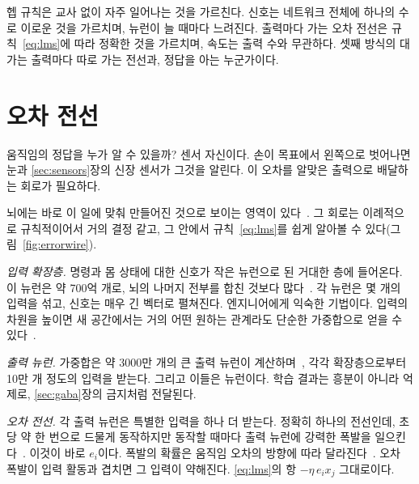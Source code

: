 \begin{keyblock}
\begin{proposition}[세 교사]
\label{prop:teachers}
헵 규칙은 교사 없이 자주 일어나는 것을 가르친다.  신호는 네트워크 전체에 하나의 수로 이로운 것을 가르치며, 뉴런이 늘 때마다 느려진다. 출력마다 가는 오차 전선은 규칙~\eqref{eq:lms}에 따라 정확한 것을 가르치며, 속도는 출력 수와 무관하다. 셋째 방식의 대가는 출력마다 따로 가는 전선과, 정답을 아는 누군가이다.
\end{proposition}
\end{keyblock}

\section{오차 전선}

움직임의 정답을 누가 알 수 있을까? 센서 자신이다. 손이 목표에서 왼쪽으로 벗어나면 눈과 \ref{sec:sensors}장의 신장 센서가 그것을 알린다. 이 오차를 알맞은 출력으로 배달하는 회로가 필요하다.

뇌에는 바로 이 일에 맞춰 만들어진 것으로 보이는 영역이 있다~\cite{Marr1969,Albus1971}. 그 회로는 이례적으로 규칙적이어서 거의 결정 같고, 그 안에서 규칙~\eqref{eq:lms}를 쉽게 알아볼 수 있다(그림~\ref{fig:errorwire}).

\emph{입력 확장층.} 명령과 몸 상태에 대한 신호가 작은  뉴런으로 된 거대한 층에 들어온다. 이 뉴런은 약 700억 개로, 뇌의 나머지 전부를 합친 것보다 많다~\cite{Azevedo2009}. 각 뉴런은 몇 개의 입력을 섞고, 신호는 매우 긴 벡터로 펼쳐진다. 엔지니어에게 익숙한 기법이다. 입력의 차원을 높이면 새 공간에서는 거의 어떤 원하는 관계라도 단순한 가중합으로 얻을 수 있다~\cite{Cover1965}.

\emph{출력 뉴런.} 가중합은 약 3000만 개의 큰 출력 뉴런이 계산하며~\cite{Andersen1992cereb}, 각각 확장층으로부터 10만 개 정도의 입력을 받는다. 그리고 이들은  뉴런이다. 학습 결과는 흥분이 아니라 억제로, \ref{sec:gaba}장의 금지처럼 전달된다.

\emph{오차 전선.} 각 출력 뉴런은 특별한 입력을 하나 더 받는다. 정확히 하나의  전선인데, 초당 약 한 번으로 드물게 동작하지만 동작할 때마다 출력 뉴런에 강력한 폭발을 일으킨다~\cite{Ito2001}. 이것이 바로 $e_i$이다. 폭발의 확률은 움직임 오차의 방향에 따라 달라진다~\cite{Herzfeld2018}. 오차 폭발이 입력 활동과 겹치면 그 입력이 약해진다. \eqref{eq:lms}의 항 $-\eta\,e_i x_j$ 그대로이다.

